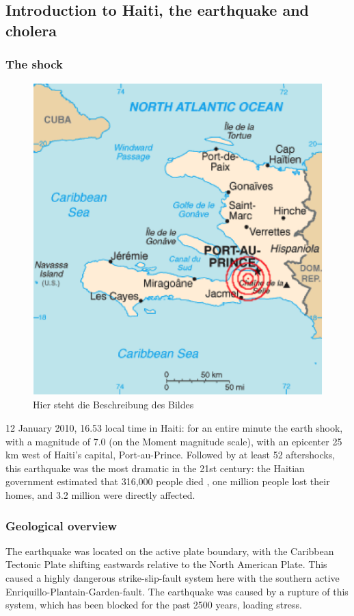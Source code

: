 \documentclass[11pt]{article}
\begin{document}
\subsection{Introduction to Haiti, the earthquake and cholera }
\subsubsection*{The shock}


\begin{figure}
\includegraphics[scale=0.8]{Bilder/KarteHaiti.png}
\caption{Hier steht die Beschreibung des Bildes}%
\label{pic:map_haiti}
\end{figure}




12 January 2010, 16.53 local time in Haiti: for an entire minute the earth shook, with a magnitude of 7.0  (on the Moment magnitude scale), with an epicenter 25 km west of Haiti's capital, Port-au-Prince. \cite{nyt:mag} Followed by at least 52 aftershocks,  this earthquake was the most dramatic in the 21st century: the Haitian government estimated that 316,000 people died \cite{web:cbc1}, one million people lost their homes, and 3.2 million were directly affected. \cite{web:ear}

\subsubsection*{Geological overview}
The earthquake was located on the active plate boundary, with the Caribbean Tectonic Plate shifting eastwards relative to the North American Plate. This caused a highly dangerous strike-slip-fault system here with the southern active Enriquillo-Plantain-Garden-fault. The earthquake was caused by a rupture of this system, which has been blocked for the past 2500 years, loading stress. \cite{web:bbc1}
\end{document}

